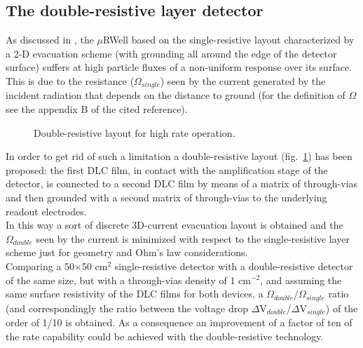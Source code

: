 \subsection{The double-resistive layer detector}
\label{sec:DRL}
%
As discussed in \cite{micro-RWELL}, the $\mu$RWell based on the single-resistive layout characterized by a 2-D evacuation scheme (with grounding all around the edge of the detector surface) suffers at high particle fluxes of a non-uniform response over its surface.
This is due to  the resistance ($\Omega_{single}$) seen by the current generated by the incident radiation that depends on the distance to ground (for the definition of $\Omega$ see the appendix B of the cited reference).\\
% 
\begin{figure}
	\begin{center}
       \caption{Double-resistive layout for high rate operation.}
        \label{resistive-stage2}
        \end{center}
\end{figure}
%  
In order to get rid of such a limitation a double-resistive layout (fig.~\ref{resistive-stage2}) has been proposed: the first DLC film, in contact with the amplification stage of the detector, is connected to a second DLC film by means of a matrix of through-vias and then grounded with a second matrix of through-vias to the underlying readout electrodes.\\
%
In this way a sort of discrete 3D-current evacuation layout is obtained and the  $\Omega_{double}$ seen by the current is minimized with respect to the single-resistive layer scheme just for geometry and Ohm's law considerations.\\
Comparing a 50$\times$50 cm$^2$ single-resistive detector with a double-resistive detector of the same size, but with a through-vias density of 1 cm$^{-2}$, and assuming the same surface resistivity of the DLC films for both devices, a $\Omega_{double}$/$\Omega_{single}$ ratio (and correspondingly the ratio between the voltage drop $\Delta$V$_{double}$/$\Delta$V$_{single}$) of the order of 1/10 is obtained. As a consequence an improvement of a factor of ten of the rate capability could be achieved with the double-resistive technology.\\
%
